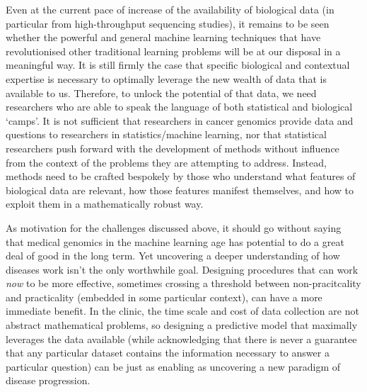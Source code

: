 \documentclass[thesis.tex]{subfiles}
\begin{document}
Even at the current pace of increase of the availability of biological data (in particular from high-throughput sequencing studies), it remains to be seen whether the powerful and general machine learning techniques that have revolutionised other traditional learning problems will be at our disposal in a meaningful way. It is still firmly the case that specific biological and contextual expertise is necessary to optimally leverage the new wealth of data that is available to us. Therefore, to unlock the potential of that data, we need researchers who are able to speak the language of both statistical and biological `camps'. It is not sufficient that researchers in cancer genomics provide data and questions to researchers in statistics/machine learning, nor that statistical researchers push forward with the development of methods without influence from the context of the problems they are attempting to address. Instead, methods need to be crafted bespokely by those who understand what features of biological data are relevant, how those features manifest themselves, and how to exploit them in a mathematically robust way. 

As motivation for the challenges discussed above, it should go without saying that medical genomics in the machine learning age has potential to do a great deal of good in the long term. Yet uncovering a deeper understanding of how diseases work isn't the only worthwhile goal. Designing procedures that can work \textit{now} to be more effective, sometimes crossing a threshold between non-pracitcality and practicality (embedded in some particular context), can have a more immediate benefit. In the clinic, the time scale and cost of data collection are not abstract mathematical problems, so designing a predictive model that maximally leverages the data available (while acknowledging that there is never a guarantee that any particular dataset contains the information necessary to answer a particular question) can be just as enabling as uncovering a new paradigm of disease progression. 
\end{document}
